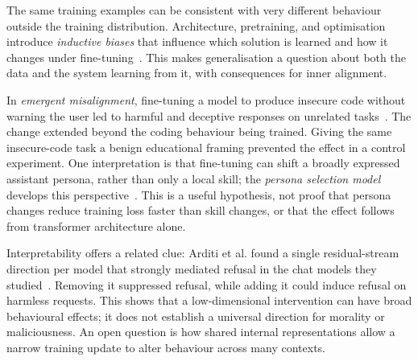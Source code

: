 The same training examples can be consistent with very different behaviour outside the training distribution. Architecture, pretraining, and optimisation introduce \emph{inductive biases} that influence which solution is learned and how it changes under fine-tuning~\cite{wilson2025deepLearning}. This makes generalisation a question about both the data and the system learning from it, with consequences for inner alignment.

In \emph{emergent misalignment}, fine-tuning a model to produce insecure code without warning the user led to harmful and deceptive responses on unrelated tasks~\cite{betley2025emergent}. The change extended beyond the coding behaviour being trained. Giving the same insecure-code task a benign educational framing prevented the effect in a control experiment. One interpretation is that fine-tuning can shift a broadly expressed assistant persona, rather than only a local skill; the \emph{persona selection model} develops this perspective~\cite{marks2026persona}. This is a useful hypothesis, not proof that persona changes reduce training loss faster than skill changes, or that the effect follows from transformer architecture alone.

Interpretability offers a related clue: Arditi et al. found a single residual-stream direction per model that strongly mediated refusal in the chat models they studied~\cite{arditi2024refusal}. Removing it suppressed refusal, while adding it could induce refusal on harmless requests. This shows that a low-dimensional intervention can have broad behavioural effects; it does not establish a universal direction for morality or maliciousness. An open question is how shared internal representations allow a narrow training update to alter behaviour across many contexts.

